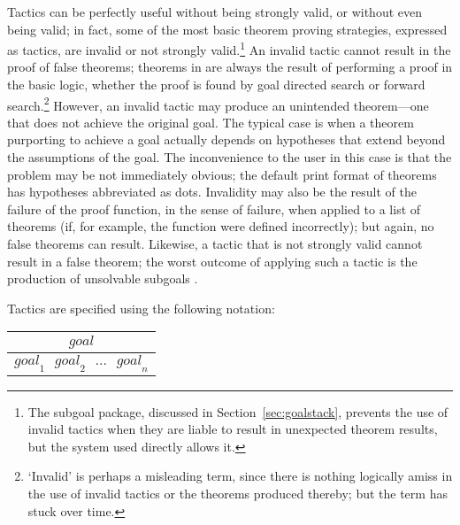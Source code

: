 Tactics can be perfectly useful without being
strongly valid, or without
even being valid;
in fact, some of the most basic theorem proving strategies, expressed
as tactics, are invalid or not strongly valid.\footnote{The subgoal
  package, discussed in Section~\ref{sec:goalstack}, prevents the use of
  invalid tactics when they are liable to result in unexpected
  theorem results, but the \HOL{} system used directly allows
  it.}
An invalid tactic cannot result in the proof of false theorems;
theorems in \HOL{} are always the result of performing a proof in the
basic logic, whether the proof is found by goal directed search
or forward search.\footnote{`Invalid' is perhaps a misleading term, since
  there is nothing logically amiss in the use of invalid tactics
  or the theorems produced thereby; but the term has stuck over time.}
However, an invalid tactic may produce an unintended theorem---one
that does not achieve the original goal. The typical case is when a
theorem purporting to achieve a goal actually depends on hypotheses
that extend beyond the assumptions of the goal.  The inconvenience to
the \HOL{} user in this case is that the problem may be not
immediately obvious; the default print format of theorems has
hypotheses abbreviated as dots. Invalidity may also be the result of
the failure
of the proof function, in the \ML{} sense of failure, when
applied to a list of theorems (if, for example, the function were
defined incorrectly); but again, no false theorems can result.
Likewise, a tactic that is not strongly valid cannot result in a false
theorem; the worst outcome of applying such a tactic is the production
of unsolvable subgoals
.

Tactics are specified using the following notation:

\begin{center}
\begin{tabular}{c} \\
$\mathit{goal}$ \\ \hline \hline
$\mathit{goal}_1\ \ \ \mathit{goal}_2 \ \ \ \ldots\ \ \ \mathit{goal}_n$ \\
\end{tabular}
\end{center}

